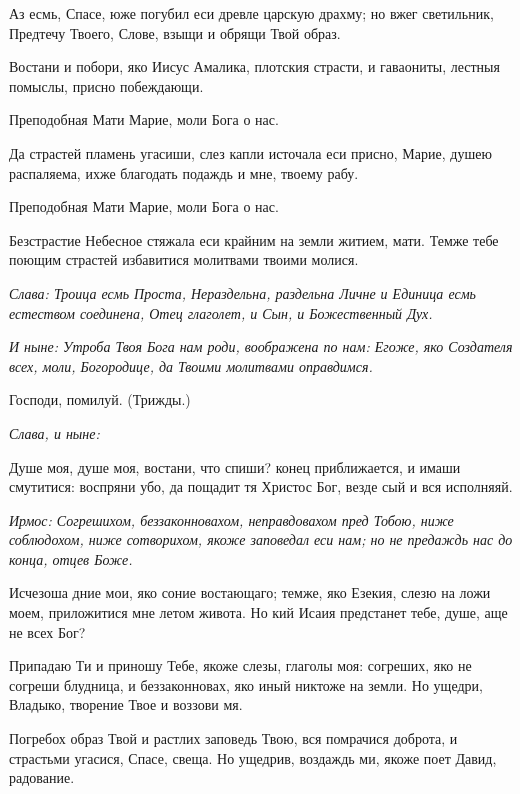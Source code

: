 Аз есмь, Спасе, юже погубил еси древле царскую драхму; но вжег светильник, Предтечу Твоего, Слове, взыщи и обрящи Твой образ. 

Востани и побори, яко Иисус Амалика, плотския страсти, и гаваониты, лестныя помыслы, присно побеждающи. 

\bfseries 

Преподобная Мати Марие, моли Бога о нас.

\normalfont{}

Да страстей пламень угасиши, слез капли источала еси присно, Марие, душею распаляема, ихже благодать подаждь и мне, твоему рабу. 

\bfseries 

Преподобная Мати Марие, моли Бога о нас.

\normalfont{}

Безстрастие Небесное стяжала еси крайним на земли житием, мати. Темже тебе поющим страстей избавитися молитвами твоими молися. 

\itshape Слава\normalfont{}: Троица есмь Проста, Нераздельна, раздельна Личне и Единица есмь естеством соединена, Отец глаголет, и Сын, и Божественный Дух. 

\itshape И ныне\normalfont{}: Утроба Твоя Бога нам роди, воображена по нам: Егоже, яко Создателя всех, моли, Богородице, да Твоими молитвами оправдимся. 

Господи, помилуй. (Трижды.) 

\itshape Слава, и ныне\normalfont{}:



Душе моя, душе моя, востани, что спиши? конец приближается, и имаши смутитися: воспряни убо, да пощадит тя Христос Бог, везде сый и вся исполняяй.



\itshape Ирмос\normalfont{}: Согрешихом, беззаконновахом, неправдовахом пред Тобою, ниже соблюдохом, ниже сотворихом, якоже заповедал еси нам; но не предаждь нас до конца, отцев Боже. 

Исчезоша дние мои, яко соние востающаго; темже, яко Езекия, слезю на ложи моем, приложитися мне летом живота. Но кий Исаия предстанет тебе, душе, аще не всех Бог? 

Припадаю Ти и приношу Тебе, якоже слезы, глаголы моя: согреших, яко не согреши блудница, и беззаконновах, яко иный никтоже на земли. Но ущедри, Владыко, творение Твое и воззови мя. 

Погребох образ Твой и растлих заповедь Твою, вся помрачися доброта, и страстьми угасися, Спасе, свеща. Но ущедрив, воздаждь ми, якоже поет Давид, радование. 

